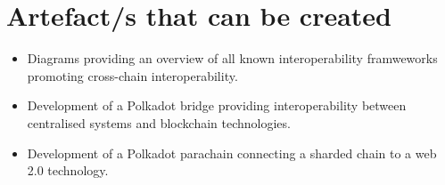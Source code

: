 \documentclass[12pt]{article}
\begin{document}
\section{Artefact/s that can be created}
\begin{itemize}
    \item Diagrams providing an overview of all known interoperability framweworks promoting cross-chain interoperability.
    \item Development of a Polkadot bridge providing interoperability between centralised systems and blockchain technologies.
    \item Development of a Polkadot parachain connecting a sharded chain to a web 2.0 technology.
\end{itemize}

\printbibliography
\end{document}
